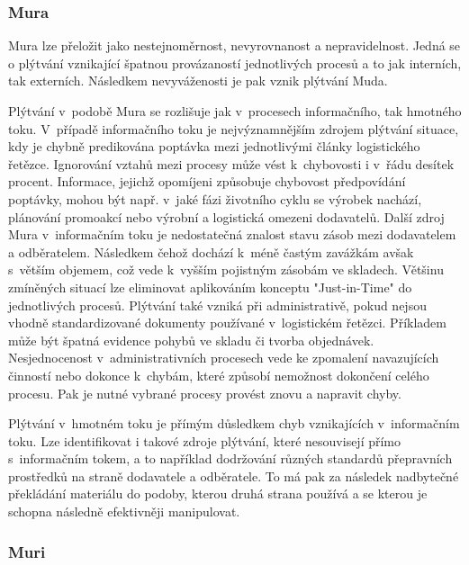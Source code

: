 
\subsubsection*{Mura}

Mura lze přeložit jako nestejnoměrnost, nevyrovnanost a nepravidelnost. Jedná se o plýtvání vznikající špatnou provázaností jednotlivých procesů a to jak interních, tak externích. Následkem nevyváženosti je pak vznik plýtvání Muda. \cite{bib:LW3, bib:Jirsak}

Plýtvání v~podobě Mura se rozlišuje jak v~procesech informačního, tak hmotného toku. V~případě informačního toku je nejvýznamnějším zdrojem plýtvání situace, 
kdy je chybně predikována poptávka mezi jednotlivými články logistického řetězce. Ignorování vztahů mezi procesy může vést k~chybovosti i v~řádu desítek procent. Informace, jejichž opomíjeni způsobuje chybovost předpovídání poptávky, mohou být např. v~jaké fázi životního cyklu se výrobek nachází, plánování promoakcí nebo výrobní a logistická omezeni dodavatelů.
Další zdroj Mura v~informačním toku je nedostatečná znalost stavu zásob mezi dodavatelem a odběratelem. Následkem čehož dochází k~méně častým zavážkám avšak s~větším objemem, což vede k~vyšším pojistným zásobám ve skladech. Většinu zmíněných situací lze eliminovat aplikováním konceptu "Just-in-Time" do jednotlivých procesů.
Plýtvání také vzniká při administrativě, pokud nejsou vhodně standardizované dokumenty používané v~logistickém řetězci. Příkladem může být špatná evidence pohybů ve skladu či tvorba objednávek. Nesjednocenost v~administrativních procesech vede ke zpomalení navazujících činností nebo dokonce k~chybám, které způsobí nemožnost dokončení celého procesu. Pak je nutné vybrané procesy provést znovu a napravit chyby.\cite{bib:Jirsak}

Plýtvání v~hmotném toku je přímým důsledkem chyb vznikajících v~informačním toku. Lze identifikovat i takové zdroje plýtvání, které nesouvisejí přímo s~informačním tokem, a to například dodržování různých standardů přepravních prostředků na straně dodavatele a odběratele. To má pak za následek nadbytečné překládání materiálu do podoby, kterou druhá strana používá a se kterou je schopna následně efektivněji manipulovat.\cite{bib:Jirsak}

\subsubsection*{Muri}


